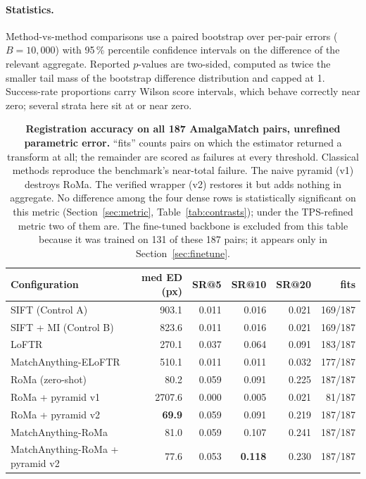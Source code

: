 \documentclass[10pt]{article}
\begin{document}
\paragraph{Statistics.} Method-vs-method comparisons use a paired bootstrap over per-pair errors ($B=10{,}000$) with 95\,\% percentile confidence intervals on the difference of the relevant aggregate. Reported $p$-values are two-sided, computed as twice the smaller tail mass of the bootstrap difference distribution and capped at 1. Success-rate proportions carry Wilson score intervals, which behave correctly near zero; several strata here sit at or near zero.

\begin{table}[t]
\centering
\small
\begin{tabular}{lrrrrr}
\toprule
Configuration & med ED (px) & SR@5 & SR@10 & SR@20 & fits \\
\midrule
SIFT (Control A)                & 903.1  & 0.011 & 0.016 & 0.021 & 169/187 \\
SIFT + MI (Control B)           & 823.6  & 0.011 & 0.016 & 0.021 & 169/187 \\
LoFTR                           & 270.1  & 0.037 & 0.064 & 0.091 & 183/187 \\
MatchAnything-ELoFTR            & 510.1  & 0.011 & 0.011 & 0.032 & 177/187 \\
RoMa (zero-shot)                & 80.2   & 0.059 & 0.091 & 0.225 & 187/187 \\
RoMa + pyramid v1               & 2707.6 & 0.000 & 0.005 & 0.021 & \phantom{0}81/187 \\
RoMa + pyramid v2               & \textbf{69.9} & 0.059 & 0.091 & 0.219 & 187/187 \\
MatchAnything-RoMa              & 81.0   & 0.059 & 0.107 & 0.241 & 187/187 \\
MatchAnything-RoMa + pyramid v2 & 77.6   & 0.053 & \textbf{0.118} & 0.230 & 187/187 \\
\bottomrule
\end{tabular}
\caption{\textbf{Registration accuracy on all 187 AmalgaMatch pairs, unrefined parametric error.} ``fits'' counts pairs on which the estimator returned a transform at all; the remainder are scored as failures at every threshold. Classical methods reproduce the benchmark's near-total failure. The naive pyramid (v1) destroys RoMa. The verified wrapper (v2) restores it but adds nothing in aggregate. No difference among the four dense rows is statistically significant on this metric (Section~\ref{sec:metric}, Table~\ref{tab:contrasts}); under the TPS-refined metric two of them are. The fine-tuned backbone is excluded from this table because it was trained on 131 of these 187 pairs; it appears only in Section~\ref{sec:finetune}.}
\label{tab:headline}
\end{table}
\end{document}
